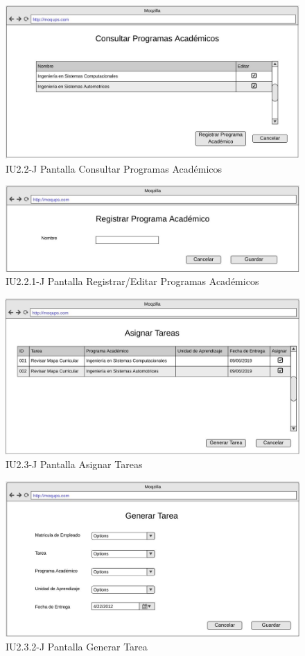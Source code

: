 \begin{figure}
    \centering
    \includegraphics[width=0.75\linewidth]{DCU/SP4/IU/Images/JefeDeInnovacionEducativa/2-2-ConsultarProgramasAcademicos-J}
    \caption{IU2.2-J Pantalla Consultar Programas Académicos}
    \label{IU2.2-J}
\end{figure}

\begin{figure}
    \centering
    \includegraphics[width=0.75\linewidth]{DCU/SP4/IU/Images/JefeDeInnovacionEducativa/2-2-1-RegistrarEditarProgramaAcademico-J}
    \caption{IU2.2.1-J Pantalla Registrar/Editar Programas Académicos}
    \label{IU2.2.1-J}
\end{figure}

\begin{figure}
    \centering
    \includegraphics[width=0.75\linewidth]{DCU/SP4/IU/Images/JefeDeInnovacionEducativa/2-3-AsignarTareas-J}
    \caption{IU2.3-J Pantalla Asignar Tareas}
    \label{IU2.3-J}
\end{figure}

\begin{figure}
	\centering
	\includegraphics[width=0.75\linewidth]{DCU/SP4/IU/Images/JefeDeInnovacionEducativa/2-3-2-GenerarTarea-J}
	\caption{IU2.3.2-J Pantalla Generar Tarea}
	\label{IU2.3.2-J}
\end{figure}
